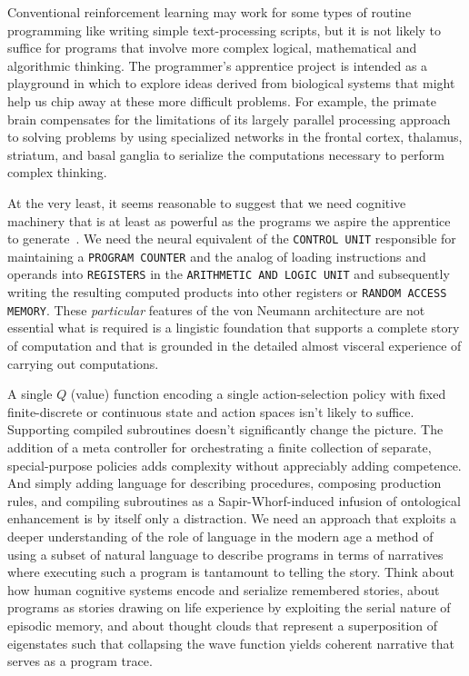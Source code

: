 Conventional reinforcement learning may work for some types of routine programming like writing simple text-processing scripts, but it is not likely to suffice for programs that involve more complex logical, mathematical and algorithmic thinking. The programmer's apprentice project is intended as a playground in which to explore ideas derived from biological systems that might help us chip away at these more difficult problems. For example, the primate brain compensates for the limitations of its largely parallel processing approach to solving problems by using specialized networks in the frontal cortex, thalamus, striatum, and basal ganglia to serialize the computations necessary to perform complex thinking. 

At the very least, it seems reasonable to suggest that we need cognitive machinery that is at least as powerful as the programs we aspire the apprentice to generate~\cite{GallistelandKing2009computational}. We need the neural equivalent of the {{\tt{CONTROL UNIT}}} responsible for maintaining a {\tt{PROGRAM COUNTER}} and the analog of loading instructions and operands into {\tt{REGISTERS}} in the {\tt{ARITHMETIC AND LOGIC UNIT}} and subsequently writing the resulting computed products into other registers or {\tt{RANDOM ACCESS MEMORY}}. These {\it{particular}} features of the von Neumann architecture are not essential \emdash{} what is required is a lingistic foundation that supports a complete story of computation and that is grounded in the detailed \emdash{} almost visceral \emdash{} experience of carrying out computations.

A single $Q$ (value) function encoding a single action-selection policy with fixed finite-discrete or continuous state and action spaces isn't likely to suffice. Supporting compiled subroutines doesn't significantly change the picture. The addition of a meta controller for orchestrating a finite collection of separate, special-purpose policies adds complexity without appreciably adding competence. And simply adding language for describing procedures, composing production rules, and compiling subroutines as a Sapir-Whorf-induced infusion of ontological enhancement is \emdash{} by itself \emdash{} only a distraction. We need an approach that exploits a deeper understanding of the role of language in the modern age \emdash{} a method of using a subset of natural language to describe programs in terms of narratives where executing such a program is tantamount to telling the story. Think about how human cognitive systems encode and serialize remembered stories, about programs as stories drawing on life experience by exploiting the serial nature of episodic memory, and about thought clouds that represent a superposition of eigenstates such that collapsing the wave function yields coherent narrative that serves as a program trace.\\

